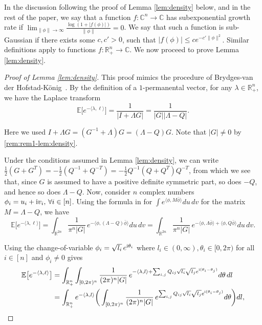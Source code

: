 \documentclass[a4paper, 11pt]{article}
\newcommand{\E}{\mathbb{E}}
\newcommand{\compi}{\textnormal{i}}
\begin{document}
In the discussion following the proof of Lemma \ref{lem:density} below, and in the rest of the paper, we say that a function $f:\mathbb{C}^n\rightarrow \mathbb{C}$ has subexponential growth rate if $\lim_{\|\phi\|\rightarrow \infty}\frac{\log(1+|f(\phi)|)}{\|\phi\|}= 0$. We say that such a function is
sub-Gaussian if there exists some $c, c'>0$, such that $|f(\phi)|\leq ce^{-c'\|\phi\|^2}$.
Similar definitions apply to functions $f:\mathbb{R}_+^n\rightarrow \mathbb{C}$. We now proceed to prove Lemma \ref{lem:density}.

\begin{proof}
[Proof of Lemma \ref{lem:density}]
This proof mimics the procedure of Brydges-van der Hofstad-König~\cite{bhk07}. By the definition of a $1$-permanental vector, for any $\lambda\in\mathbb{R}_+^n$, we have the Laplace transform
    \[\E\big[e^{-\langle\lambda,\ell\rangle}\big]=\frac{1}{|I+\Lambda G|}=\frac{1}{|G||\Lambda -Q|}.\]

Here we used $I+\Lambda G=(G^{-1}+\Lambda)G=(\Lambda-Q)G$. Note that $|G|\neq 0$ by \cref{rem:rem1-lem:density}.

Under the conditions assumed in Lemma \ref{lem:density}, we can write $\frac{1}{2}(G + G^T) = - \frac{1}{2} (Q^{-1} + Q^{-T}) = - \frac{1}{2} Q^{-1} (Q + Q^T) Q^{-T}$, from which we see that, since $G$ is assumed to have a positive definite symmetric part, so does $- Q$, and hence so does $\Lambda-Q$. Now, consider $n$ complex numbers $\phi_i=u_i+\compi v_i, \,\forall i\in[n]$. Using the formula in \cite[Lemma 2.2]{bhk07} for $\int e^{\langle\phi,M\bar{\phi}\rangle}du\,dv$ for the matrix $M=\Lambda-Q$, we have
    \[\E\big[e^{-\langle\lambda,\ell\rangle}\big]
=\int_{\mathbb{R}^{2n}}\frac{1}{\pi^n|G|}\, e^{-\langle\phi, (\Lambda-Q)\bar{\phi}\rangle}du\,dv =\int_{\mathbb{R}^{2n}}\frac{1}{\pi^n|G|}\, e^{-\langle\phi, \Lambda\bar{\phi}\rangle+\langle \phi, Q\bar{\phi}\rangle}du\,dv.\]

Using the change-of-variable $\phi_i=\sqrt{l_i}\,e^{\compi\theta_i}$ where $l_i\in(0,\infty), \theta_i\in[0,2\pi)$
for all $i\in[n]$ and $\phi_i \neq 0$ gives
    \begin{equation*}
    \begin{aligned}
    \E\big[e^{-\langle\lambda,\ell\rangle}\big] &=\int_{\mathbb{R}_+^n}\int_{[0,2\pi)^n}\frac{1}{(2\pi)^n|G|}\, e^{-\langle\lambda, l\rangle+\sum_{i,j} Q_{ij}\sqrt{l_i}\sqrt{l_j}e^{\compi (\theta_i-\theta_j)}}d\theta\,dl\\
    &=\int_{\mathbb{R}_+^n} e^{-\langle\lambda, l\rangle} \bigg(\int_{[0,2\pi)^n}\frac{1}{(2\pi)^n|G|}\, e^{\sum_{i,j} Q_{ij}\sqrt{l_i}\sqrt{l_j}e^{\compi (\theta_i-\theta_j)}}d\theta\bigg)dl,
    \end{aligned}
    \end{equation*}


\end{proof}
\end{document}
